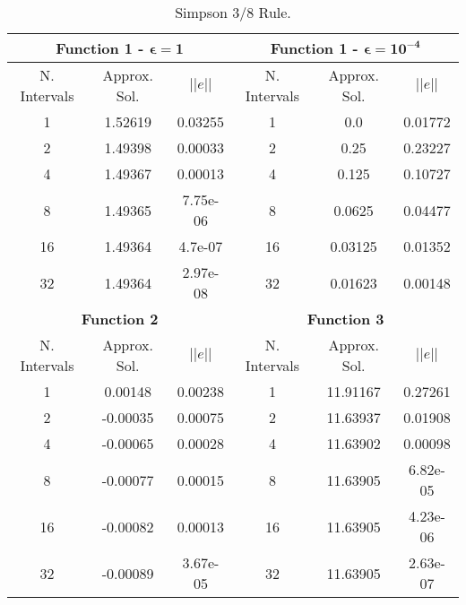 \begin{table}[H]
    \centering
    \caption{Simpson 3/8 Rule.}
    \begin{tabular}{ccc|ccc}
    \hline
    \multicolumn{3}{c}{\textbf{Function 1  -} $\bm{\epsilon = 1}$} & \multicolumn{3}{c}{\textbf{Function 1 -} $\bm{\epsilon = 10^{-4}}$} \\ \hline
    N. Intervals & Approx. Sol. & $|| e ||$ & N. Intervals & Approx. Sol. & $|| e ||$ \\ \hline
    1 & 1.52619 & 0.03255 & 1 & 0.0 & 0.01772 \\
    2 & 1.49398 & 0.00033 & 2 & 0.25 & 0.23227 \\
    4 & 1.49367 & 0.00013 & 4 & 0.125 & 0.10727 \\
    8 & 1.49365 & 7.75e-06 & 8 & 0.0625 & 0.04477 \\
    16 & 1.49364 & 4.7e-07 & 16 & 0.03125 & 0.01352 \\
    32 & 1.49364 & 2.97e-08 & 32 & 0.01623 & 0.00148 \\ \hline
    \multicolumn{3}{c}{\textbf{Function 2}} & \multicolumn{3}{c}{\bf{Function 3}} \\ \hline
    N. Intervals & Approx. Sol. & $|| e ||$ & N. Intervals & Approx. Sol. & $|| e ||$ \\ \hline
    1 & 0.00148  & 0.00238 & 1 & 11.91167 & 0.27261  \\
    2 & -0.00035  & 0.00075 & 2 & 11.63937 & 0.01908  \\
    4 & -0.00065 & 0.00028 & 4 & 11.63902 & 0.00098 \\
    8 & -0.00077 & 0.00015 & 8 &  11.63905 &  6.82e-05 \\
    16 & -0.00082 & 0.00013 & 16 & 11.63905 &  4.23e-06 \\
    32 & -0.00089 & 3.67e-05  & 32 & 11.63905 & 2.63e-07  \\ \hline
    \end{tabular}
\end{table}

